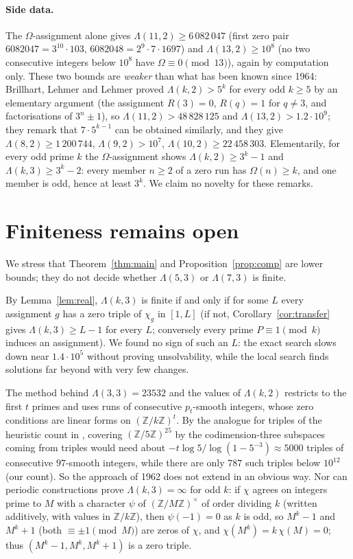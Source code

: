 \documentclass[11pt]{article}
\numberwithin{equation}{section}
\theoremstyle{definition}
\theoremstyle{remark}
\newcommand{\Z}{\mathbb Z}
\begin{document}
\paragraph{Side data.} The $\Omega$-assignment alone gives $\Lambda(11,2)\ge6\,082\,047$ (first zero
pair $6082047=3^{10}\cdot103$, $6082048=2^9\cdot7\cdot1697$) and
$\Lambda(13,2)\ge10^8$ (no two consecutive integers below $10^8$ have $\Omega\equiv0\pmod{13}$), again by
computation only. These two bounds are \emph{weaker} than what has been known since 1964: Brillhart,
Lehmer and Lehmer \cite[\S\S1, 6]{BLL64} proved $\Lambda(k,2)>5^k$ for every odd $k\ge5$ by an
elementary argument (the assignment $R(3)=0$, $R(q)=1$ for $q\ne3$, and factorisations of $3^n\pm1$),
so $\Lambda(11,2)>48\,828\,125$ and $\Lambda(13,2)>1.2\cdot10^9$; they remark that $7\cdot5^{k-1}$ can be
obtained similarly, and they give $\Lambda(8,2)\ge1\,200\,744$, $\Lambda(9,2)>10^7$,
$\Lambda(10,2)\ge22\,458\,303$. Elementarily, for every odd prime $k$ the
$\Omega$-assignment shows $\Lambda(k,2)\ge3^k-1$ and $\Lambda(k,3)\ge3^k-2$: every member $n\ge2$ of a zero
run has $\Omega(n)\ge k$, and one member is odd, hence at least $3^k$. We claim no novelty for these remarks.

\section{Finiteness remains open}\label{sec:open}

We stress that Theorem~\ref{thm:main} and Proposition~\ref{prop:comp} are lower bounds; they do not decide whether
$\Lambda(5,3)$ or $\Lambda(7,3)$ is finite.

By Lemma~\ref{lem:real}, $\Lambda(k,3)$ is finite if and only if for some $L$ every assignment $g$ has a zero
triple of $\chi_g$ in $[1,L]$ (if not, Corollary~\ref{cor:transfer} gives $\Lambda(k,3)\ge L-1$ for every $L$;
conversely every prime $P\equiv1\pmod k$ induces an assignment). We found no sign of such an $L$: the exact search slows down near $1.4\cdot10^5$ without proving
unsolvability, while the local search finds solutions far beyond with very few changes.

The method behind $\Lambda(3,3)=23532$ \cite{LLMS62} and the values of $\Lambda(k,2)$ restricts to the
first $t$ primes and uses runs of consecutive $p_t$-smooth integers, whose zero conditions are linear
forms on $(\Z/k\Z)^t$. By the analogue for triples of the heuristic count in \cite[p.~174]{LLM63}, covering $(\Z/5\Z)^{25}$ by the
codimension-three subspaces coming from triples would need about
$-t\log5/\log(1-5^{-3})\approx5000$ triples of consecutive $97$-smooth integers, while there are only
$787$ such triples below $10^{12}$ (our count). So the approach of 1962 does not extend in an obvious way.
Nor can periodic constructions prove $\Lambda(k,3)=\infty$ for odd $k$: if $\chi$ agrees on integers
prime to $M$ with a character $\psi$ of $(\Z/M\Z)^\times$ of order dividing $k$ (written additively,
with values in $\Z/k\Z$), then $\psi(-1)=0$ as $k$ is odd, so $M^k-1$ and $M^k+1$ (both $\equiv\pm1\pmod M$)
are zeros of $\chi$, and $\chi(M^k)=k\,\chi(M)=0$; thus $(M^k-1,M^k,M^k+1)$ is a zero triple.
\end{document}
